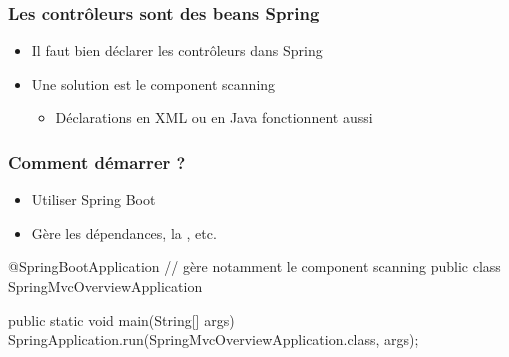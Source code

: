 \begin{frame}
 \frametitle{Les contrôleurs sont des beans Spring}

  \begin{itemize}
   \item Il faut bien déclarer les contrôleurs dans Spring
   \item Une solution est le component scanning
   \begin{itemize}
    \item Déclarations en XML ou en Java fonctionnent aussi
   \end{itemize}
  \end{itemize}

\end{frame}

\begin{frame}[fragile]
 \frametitle{Comment démarrer ?}

  \begin{itemize}
    \item Utiliser Spring Boot
    \item Gère les dépendances, la , etc.
  \end{itemize}

  \begin{javacode}
 @SpringBootApplication // g\`ere notamment le component scanning
 public class SpringMvcOverviewApplication {

   public static void main(String[] args) {
     SpringApplication.run(SpringMvcOverviewApplication.class, args);
   }

 }
  \end{javacode}

\end{frame}
